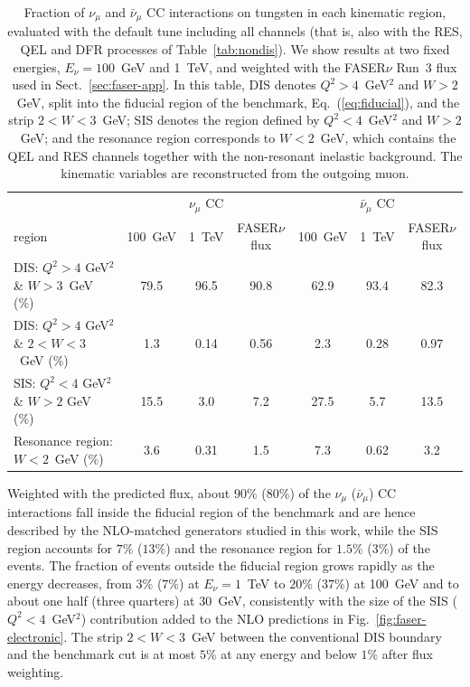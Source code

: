 \begin{table}[!tbp]
  \centering
  \small
  \renewcommand{\arraystretch}{1.50}
  \begin{tabularx}{\textwidth}{X | ccc | ccc}
    \toprule
    & \multicolumn{3}{c|}{$\nu_\mu$ CC} & \multicolumn{3}{c}{$\bar\nu_\mu$ CC} \\
    region & 100~GeV & 1~TeV & FASER$\nu$ flux & 100~GeV & 1~TeV & FASER$\nu$ flux \\
    \midrule
    DIS: $Q^2>4$ GeV$^2$ \& $W>3$~GeV (\%)& 79.5 & 96.5 & 90.8 & 62.9 & 93.4 & 82.3 \\
    DIS: $Q^2>4$ GeV$^2$ \& $2<W<3$~GeV (\%)            &  1.3 & 0.14 & 0.56 &  2.3 & 0.28 & 0.97 \\
    SIS: $Q^2<4$ GeV$^2$ \& $W > 2$ GeV (\%)                         & 15.5 &  3.0 &  7.2 & 27.5 &  5.7 & 13.5 \\
    Resonance region: $W<2$~GeV (\%)       &  3.6 & 0.31 &  1.5 &  7.3 & 0.62 &  3.2 \\
    \bottomrule
  \end{tabularx}
  \vspace{0.3cm}
  \caption{Fraction of $\nu_\mu$ and $\bar\nu_\mu$ CC interactions on tungsten in each kinematic region, evaluated with the default \genie tune including all channels (that is, also with the RES, QEL and DFR processes of Table~\ref{tab:nondis}).
  We show results at two fixed energies, $E_\nu=100$~GeV and 1~TeV, and weighted with the FASER$\nu$ Run~3 flux used in Sect.~\ref{sec:faser-app}.
  In this table, DIS denotes $Q^2>4$~GeV$^2$ and $W>2$~GeV, split into the fiducial region of the benchmark, Eq.~(\ref{eq:fiducial}), and the strip $2<W<3$~GeV; SIS denotes the region defined by $Q^2<4$~GeV$^2$ and $W>2$~GeV; and the resonance region corresponds to $W<2$~GeV, which contains the QEL and RES channels together with the non-resonant inelastic background.
  The kinematic variables are reconstructed from the outgoing muon.
}
  \label{tab:kin-regions}
\end{table}

Weighted with the predicted flux, about $90\%$ ($80\%$) of the $\nu_\mu$ ($\bar\nu_\mu$) CC interactions fall inside the fiducial region of the benchmark and are hence described by the NLO-matched generators studied in this work, while the SIS region accounts for $7\%$ ($13\%$) and the resonance region for $1.5\%$ ($3\%$) of the events.
%
The fraction of events outside the fiducial region grows rapidly as the energy decreases, from $3\%$ ($7\%$) at $E_\nu=1$~TeV to $20\%$ ($37\%$) at 100~GeV and to about one half (three quarters) at 30~GeV, consistently with the size of the SIS ($Q^2<4$~GeV$^2$) contribution added to the NLO predictions in Fig.~\ref{fig:faser-electronic}.
%
The strip $2<W<3$~GeV between the conventional DIS boundary and the benchmark cut is at most $5\%$ at any energy and below $1\%$ after flux weighting.
